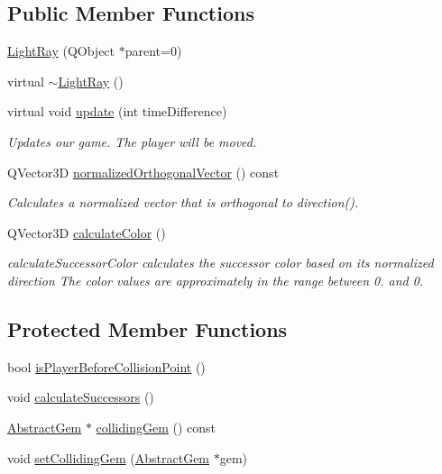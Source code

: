 \subsection*{Public Member Functions}
\begin{DoxyCompactItemize}
\item 
\hyperlink{class_light_ray_a311f25dc81f2acfe6bc9f7379f76e6fe}{Light\+Ray} (Q\+Object $\ast$parent=0)
\item 
virtual \hyperlink{class_light_ray_a1ec27c859b1851ef680f803ae0555f17}{$\sim$\+Light\+Ray} ()
\item 
virtual void \hyperlink{class_light_ray_acf06a71a307433fa5b220baccf809e64}{update} (int time\+Difference)
\begin{DoxyCompactList}\small\item\em Updates our game. The player will be moved. \end{DoxyCompactList}\item 
Q\+Vector3\+D \hyperlink{class_light_ray_ab8723690d8af8cb9b4ba339eff784135}{normalized\+Orthogonal\+Vector} () const 
\begin{DoxyCompactList}\small\item\em Calculates a normalized vector that is orthogonal to direction(). \end{DoxyCompactList}\item 
Q\+Vector3\+D \hyperlink{class_light_ray_afe5d6813717569166a2c2ca29b2bc923}{calculate\+Color} ()
\begin{DoxyCompactList}\small\item\em calculate\+Successor\+Color calculates the successor color based on its normalized direction The color values are approximately in the range between 0. and 0. \end{DoxyCompactList}\end{DoxyCompactItemize}
\subsection*{Protected Member Functions}
\begin{DoxyCompactItemize}
\item 
bool \hyperlink{class_light_ray_ad2f26e29e0781597f7bf106396ba2fb7}{is\+Player\+Before\+Collision\+Point} ()
\item 
void \hyperlink{class_light_ray_a1711b1964da22ce4083740adc2233780}{calculate\+Successors} ()
\item 
\hyperlink{class_abstract_gem}{Abstract\+Gem} $\ast$ \hyperlink{class_light_ray_a9db8f3d965dec84c167b6634bee842f4}{colliding\+Gem} () const 
\item 
void \hyperlink{class_light_ray_a87c45492f6508b5c1adf8300babf8eeb}{set\+Colliding\+Gem} (\hyperlink{class_abstract_gem}{Abstract\+Gem} $\ast$gem)
\end{DoxyCompactItemize}
